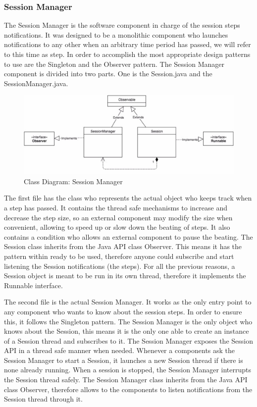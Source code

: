 \documentclass[11pt]{article}
\begin{document}
\begin{itemize}
\subsubsection{Session Manager}
The Session Manager is the software component in charge of the session steps notifications. 
It was designed to be a monolithic component who launches notifications to any other when an arbitrary time period has passed, we will refer to this time as step. In order to accomplish the most appropriate design patterns to use are the Singleton and the Observer pattern.
The Session Manager component is divided into two parts. One is the Session.java and the SessionManager.java.

\begin{figure}[h]
        \includegraphics[width=14cm]{Picture3} 
        \centering
        \caption{Class Diagram: Session Manager}
        \label{cdsm}
\end{figure}

The first file has the class who represents the actual object who keeps track when a step has passed. It contains the thread safe mechanisms to increase and decrease the step size, so an external component may modify the size when convenient, allowing to speed up or slow down the beating of steps. It also contains a condition who allows an external component to pause the beating. The Session class inherits from the Java API class Observer. This means it has the pattern within ready to be used, therefore anyone could subscribe and start listening the Session notifications (the steps). For all the previous reasons, a Session object is meant to be run in its own thread, therefore it implements the Runnable interface.

The second file is the actual Session Manager. It works as the only entry point to any component who wants to know about the session steps. In order to ensure this, it follows the Singleton pattern. The Session Manager is the only object who knows about the Session, this means it is the only one able to create an instance of a Session thread and subscribes to it. The Session Manager exposes the Session API in a thread safe manner when needed. Whenever a components ask the Session Manager to start a Session, it launches a new Session thread if there is none already running. When a session is stopped, the Session Manager interrupts the Session thread safely. The Session Manager class inherits from the Java API class Observer, therefore allows to the components to listen notifications from the Session thread through it.


\end{itemize}
\end{document}
